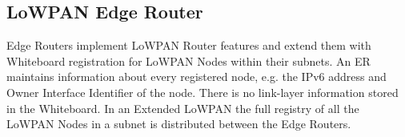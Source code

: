 \subsection{LoWPAN Edge Router}
Edge Routers implement LoWPAN Router features and extend them with Whiteboard registration for LoWPAN Nodes within their subnets. An ER maintains information about every registered node, e.g. the IPv6 address and Owner Interface Identifier of the node. There is no link-layer information stored in the Whiteboard. In an Extended LoWPAN the full registry of all the LoWPAN Nodes in a subnet is distributed between the Edge Routers.


